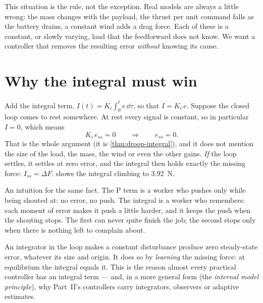 This situation is the rule, not the exception. Real models are always a little wrong: the mass changes with the payload, the thrust per unit command falls as the battery drains, a constant wind adds a drag force. Each of these is a constant, or slowly varying, load that the feedforward does not know. We want a controller that removes the resulting error \emph{without} knowing its cause.

\section{Why the integral must win}

Add the integral term, $I(t) = K_i\int_0^t e\,\dd\tau$, so that $\dot I = K_i\,e$. Suppose the closed loop comes to rest somewhere. At rest every signal is constant, so in particular $\dot I = 0$, which means
\begin{equation}
  K_i\,e_{ss} = 0 \qquad\Longrightarrow\qquad e_{ss} = 0 .
\end{equation}
That is the whole argument (it is \cref{thm:droop-integral}), and it does not mention the size of the load, the mass, the wind or even the other gains. \emph{If} the loop settles, it settles at zero error, and the integral then holds exactly the missing force: $I_{ss} = \Delta F$.  shows the integral climbing to \SI{3.92}{N}.


An intuition for the same fact. The P term is a worker who pushes only while being shouted at: no error, no push. The integral is a worker who remembers: each moment of error makes it push a little harder, and it keeps the push when the shouting stops. The first can never quite finish the job; the second stops only when there is nothing left to complain about.

\begin{keyidea}
An integrator in the loop makes a constant disturbance produce zero steady-state error, whatever its size and origin. It does so by \emph{learning} the missing force: at equilibrium the integral equals it. This is the reason almost every practical controller has an integral term — and, in a more general form (the \emph{internal model principle}), why Part~II's controllers carry integrators, observers or adaptive estimates.
\end{keyidea}


